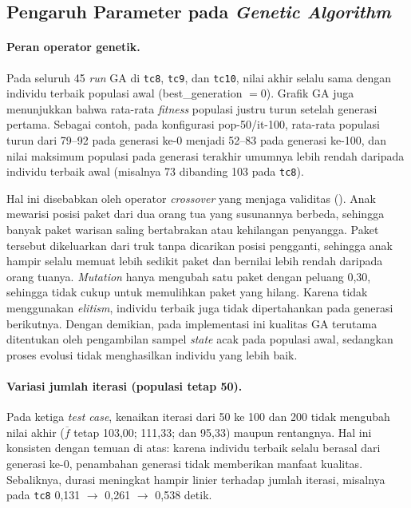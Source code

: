 \subsection{Pengaruh Parameter pada \textit{Genetic Algorithm}}
\label{subsec:ga-param}

\paragraph{Peran operator genetik.}
Pada seluruh 45 \textit{run} GA di \texttt{tc8}, \texttt{tc9}, dan \texttt{tc10}, nilai akhir selalu sama dengan individu terbaik populasi awal (best\_generation $= 0$). Grafik GA juga menunjukkan bahwa rata-rata \textit{fitness} populasi justru turun setelah generasi pertama. Sebagai contoh, pada konfigurasi pop-50/it-100, rata-rata populasi turun dari 79--92 pada generasi ke-0 menjadi 52--83 pada generasi ke-100, dan nilai maksimum populasi pada generasi terakhir umumnya lebih rendah daripada individu terbaik awal (misalnya 73 dibanding 103 pada \texttt{tc8}).

Hal ini disebabkan oleh operator \textit{crossover} yang menjaga validitas (). Anak mewarisi posisi paket dari dua orang tua yang susunannya berbeda, sehingga banyak paket warisan saling bertabrakan atau kehilangan penyangga. Paket tersebut dikeluarkan dari truk tanpa dicarikan posisi pengganti, sehingga anak hampir selalu memuat lebih sedikit paket dan bernilai lebih rendah daripada orang tuanya. \textit{Mutation} hanya mengubah satu paket dengan peluang 0,30, sehingga tidak cukup untuk memulihkan paket yang hilang. Karena tidak menggunakan \textit{elitism}, individu terbaik juga tidak dipertahankan pada generasi berikutnya. Dengan demikian, pada implementasi ini kualitas GA terutama ditentukan oleh pengambilan sampel \textit{state} acak pada populasi awal, sedangkan proses evolusi tidak menghasilkan individu yang lebih baik.

\paragraph{Variasi jumlah iterasi (populasi tetap 50).}
Pada ketiga \textit{test case}, kenaikan iterasi dari 50 ke 100 dan 200 tidak mengubah nilai akhir ($\overline{f}$ tetap 103,00; 111,33; dan 95,33) maupun rentangnya. Hal ini konsisten dengan temuan di atas: karena individu terbaik selalu berasal dari generasi ke-0, penambahan generasi tidak memberikan manfaat kualitas. Sebaliknya, durasi meningkat hampir linier terhadap jumlah iterasi, misalnya pada \texttt{tc8} 0,131 $\to$ 0,261 $\to$ 0,538 detik.

